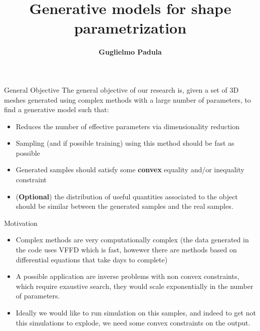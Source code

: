 \documentclass{beamer}
\title[Generative models for shape parametrization]{Generative models for shape parametrization}
\author[G. Padula]{\textbf{Guglielmo Padula}}
\institute{University of Trieste}
\date{}
\begin{document}
\begin{frame}
\titlepage
\end{frame}

\begin{frame}{General Objective}
The general objective of our research is, given a set of 3D meshes generated using complex methods with a large number of parameters, to find a generative model such that:
\begin{itemize}
\item Reduces the number of effective parameters via dimensionality reduction
\item Sampling (and if possible training)  using this method should be fast as possible
\item Generated samples should satisfy some \textbf{convex} equality and/or inequality constraint   
\item (\textbf{Optional}) the distribution of useful quantities associated to the object should be similar between the generated samples and the real samples.
\end{itemize}
\end{frame}
\begin{frame}{Motivation}
\begin{itemize}
\item Complex methods are very computationally complex (the data generated in the code uses VFFD which is fast, howewer there are methods based on differential equations that take days to complete)
\item A possible application are inverse problems with non convex constraints, which require exaustive search,  they would scale exponentially in the number of parameters.
\item Ideally we would like to run simulation on this samples, and indeed to get not this simulations to explode, we need some convex constraints on the output. 
\end{itemize}
\end{frame}
\end{document}

